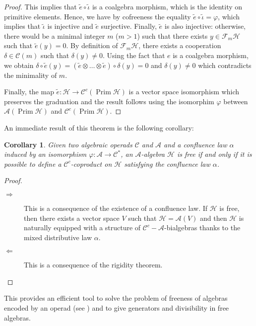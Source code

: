 \documentclass[11pt,leqno]{amsart}
\theoremstyle{definition}
\theoremstyle{plain}
\newtheorem{corollary}[definition]{Corollary}
\DeclareMathOperator{\prim}{Prim}
\newcommand{\Hc}{ \mathcal{H} }
\newcommand{\A}{ \mathcal{A} }
\newcommand{\C}{ \mathcal{C} }
\newcommand{\F}{ \mathcal{F} }
\begin{document}
\begin{proof}
\vspace{0.5cm}

This implies that $\tilde e \circ \tilde{\iota}$ is a coalgebra morphism, which is the identity on primitive elements. Hence, we have by cofreeness the equality $\tilde e \circ \tilde{\iota} = \varphi$, which implies that $\tilde{\iota}$ is injective and $\tilde{e}$ surjective. Finally, $\tilde{e}$ is also injective: otherwise, there would be a minimal integer $m$ ($m>1$) such that there exists $y \in \F_m \Hc$ such that $\tilde{e}(y)=0$. By definition of $\F_m \Hc$, there exists a cooperation $\delta \in \C(m)$ such that $\delta(y) \neq 0$. Using the fact that $e$ is a coalgebra morphism, we obtain $\delta \circ \tilde{e} (y)= (\tilde{e} \otimes \ldots \otimes \tilde{e}) \circ \delta (y)= 0$ and $\delta(y) \neq 0$ which contradicts the minimality of $m$.

Finally, the map $\tilde e: \Hc \to \C^c(\prim \Hc)$  is a vector space isomorphism which preserves the graduation and the result follows using the isomorphim $\varphi$ between $\A(\prim \Hc)$ and $\C^c(\prim \Hc)$.
\end{proof}

An immediate result of this theorem is the following corollary:

\begin{corollary} Given two algebraic operads $\C$ and $\A$ and a confluence law $\alpha$ induced by an isomorphism $\varphi: \A \rightarrow \C^*$, an $\A$-algebra $\mathcal{H}$ is free if and only if it is possible to define a $\C^c$-coproduct on $\mathcal{H}$ satisfying the confluence law $\alpha$.
\end{corollary}

\begin{proof}
\begin{description}
\item[$\Rightarrow$] This is a consequence of the existence of a confluence law. If $\Hc$ is free, then there exists a vector space $V$ such that $\Hc=\A(V)$ and then $\Hc$ is naturally equipped with a structure of $\C^c-\A$-bialgebras thanks to the mixed distributive law $\alpha$.

\item[$\Leftarrow$] This is a consequence of the rigidity theorem.
\end{description}
\end{proof}

This provides an efficient tool to solve the problem of freeness of algebras encoded by an operad (see \cite{EPLM}) and to give generators and divisibility in free algebras.
\end{document}
